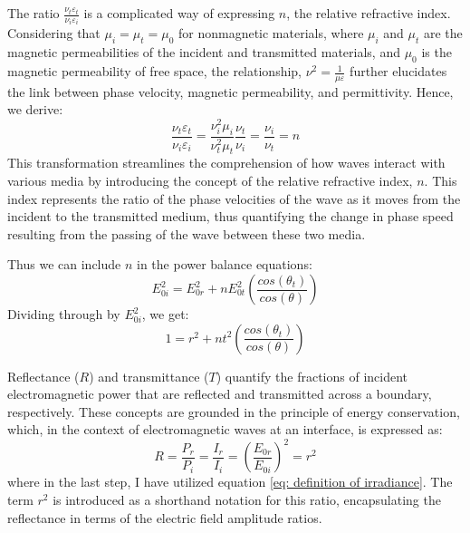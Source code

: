 The ratio $\frac{\nu_t\varepsilon_t}{\nu_i\varepsilon_i}$ is a complicated way of expressing $n$, the relative refractive index. Considering that $\mu_i = \mu_t = \mu_0$ for nonmagnetic materials, where $\mu_i$ and $\mu_t$ are the magnetic permeabilities of the incident and transmitted materials, and $\mu_0$ is the magnetic permeability of free space, the relationship, $\nu^2 = \frac{1}{\mu \varepsilon}$ further elucidates the link between phase velocity, magnetic permeability, and permittivity. Hence, we derive:
\begin{equation}
\frac{\nu_t\varepsilon_t}{\nu_i\varepsilon_i} = \frac{\nu_i^2\mu_i}{\nu_t^2\mu_t} \frac{\nu_t}{\nu_i} = \frac{\nu_i}{\nu_t} = n
\end{equation}
This transformation streamlines the comprehension of how waves interact with various media by introducing the concept of the relative refractive index, $n$. This index represents the ratio of the phase velocities of the wave as it moves from the incident to the transmitted medium, thus quantifying the change in phase speed resulting from the passing of the wave between these two media.

Thus we can include $n$ in the power balance equations:
\begin{equation}
E_{0i}^2 = E_{0r}^2 + n E_{0t}^2 \left(\frac{cos(\theta_t)}{cos(\theta)} \right)
\end{equation}
Dividing through by $E_{0i}^2$, we get:
\begin{equation} \label{power balance equation with r^2 and t^2}
1 = r^2 + n t^2 \left(\frac{cos(\theta_t)}{cos(\theta)} \right)
\end{equation}

Reflectance ($R$) and transmittance ($T$) quantify the fractions of incident electromagnetic power that are reflected and transmitted across a boundary, respectively. These concepts are grounded in the principle of energy conservation, which, in the context of electromagnetic waves at an interface, is expressed as:
\begin{equation} \label{definition of R}
    R = \frac{P_r}{P_i} = \frac{I_r}{I_i} = \left(\frac{E_{0r}}{E_{0i}}\right)^2 = r^2
\end{equation}
where in the last step, I have utilized equation \ref{eq: definition of irradiance}. The term $r^2$ is introduced as a shorthand notation for this ratio, encapsulating the reflectance in terms of the electric field amplitude ratios.

